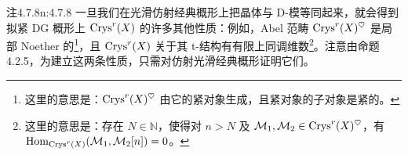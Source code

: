 \begin{othm}{注}{4.7.8}{n:4.7.8}
一旦我们在光滑仿射经典概形上把晶体与 D-模等同起来，就会得到拟紧 DG 概形上 $\mathrm{Crys}^r(X)$ 的许多其他性质：例如，Abel 范畴 $\mathrm{Crys}^r(X)^{\heartsuit}$ 是局部 Noether 的\footnote{这里的意思是：$\mathrm{Crys}^r(X)^{\heartsuit}$ 由它的紧对象生成，且紧对象的子对象是紧的。}，且 $\mathrm{Crys}^r(X)$ 关于其 t-结构有有限上同调维数\footnote{这里的意思是：存在 $N\in\mathbb{N}$，使得对 $n>N$ 及 $\mathcal{M}_1,\mathcal{M}_2\in\mathrm{Crys}^r(X)^{\heartsuit}$，有 $\mathrm{Hom}_{\mathrm{Crys}^r(X)}(\mathcal{M}_1,\mathcal{M}_2[n])=0$。}。注意由命题 4.2.5，为建立这两条性质，只需对仿射光滑经典概形证明它们。
\end{othm}
